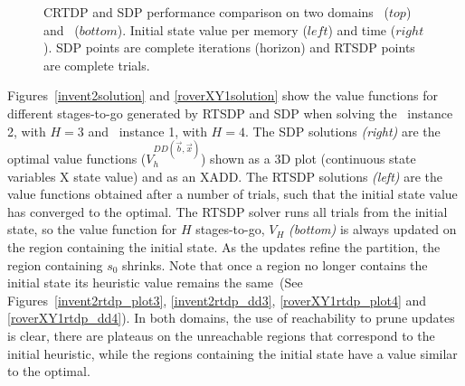 \vspace{-3mm}
\begin{figure}[ht]
\hspace{-2mm}

\vspace{-4mm}
\hspace{-2mm}

\vspace{-4mm}
\hspace{-2mm}
\caption{CRTDP and SDP performance comparison on two domains \Invent ~($top$) and \Mars~($bottom$). Initial state value per memory ($left$) and time ($right$). SDP points are complete iterations (horizon) and RTSDP points are complete trials.}
\label{fig:performance}
\end{figure}


Figures~\ref{invent2solution} and \ref{roverXY1solution} show the value functions for different stages-to-go generated by RTSDP and SDP when solving the \Invent~instance 2, with $H = 3$ and \Mars~instance 1, with $H=4$.
The SDP solutions {\it(right)} are the optimal value functions ($V_h^{DD(\vec{b},\vec{x})}$) shown as a 3D plot (continuous state variables X state value) and as an XADD. 
The RTSDP solutions {\it (left)} are the value functions obtained after a number of trials, such that the initial state value has converged to the optimal.
The RTSDP solver runs all trials from the initial state, so the value function for $H$ stages-to-go, $V_H$ {\it (bottom)} is always updated on the region containing the initial state.
As the updates refine the partition, the region containing $s_0$ shrinks.
Note that once a region no longer contains the initial state its heuristic value remains the same~(See Figures~\ref{invent2rtdp_plot3}, \ref{invent2rtdp_dd3}, \ref{roverXY1rtdp_plot4} and \ref{roverXY1rtdp_dd4}). In both domains, the use of reachability to prune updates is clear, there are plateaus on the unreachable regions that correspond to the initial heuristic, while the regions containing the initial state have a value similar to the optimal.


